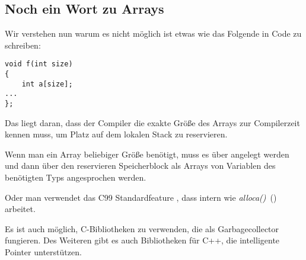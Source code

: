 \subsection{Noch ein Wort zu Arrays}
Wir verstehen nun warum es nicht möglich ist etwas wie das Folgende in \CCpp Code zu schreiben:

\begin{lstlisting}[style=customc]
void f(int size)
{
    int a[size];
...
};
\end{lstlisting}
Das liegt daran, dass der Compiler die exakte Größe des Arrays zur Compilerzeit kennen muss, um Platz auf dem lokalen
Stack zu reservieren.

Wenn man ein Array beliebiger Größe benötigt, muss es über  angelegt werden und dann über den reservieren
Speicherblock als Arrays von Variablen des benötigten Typs angesprochen werden.

Oder man verwendet das C99 Standardfeature , dass intern wie
\emph{alloca()}~() arbeitet.

Es ist auch möglich, C-Bibliotheken zu verwenden, die als Garbagecollector fungieren.
Des Weiteren gibt es auch Bibliotheken für C++, die intelligente Pointer unterstützen.